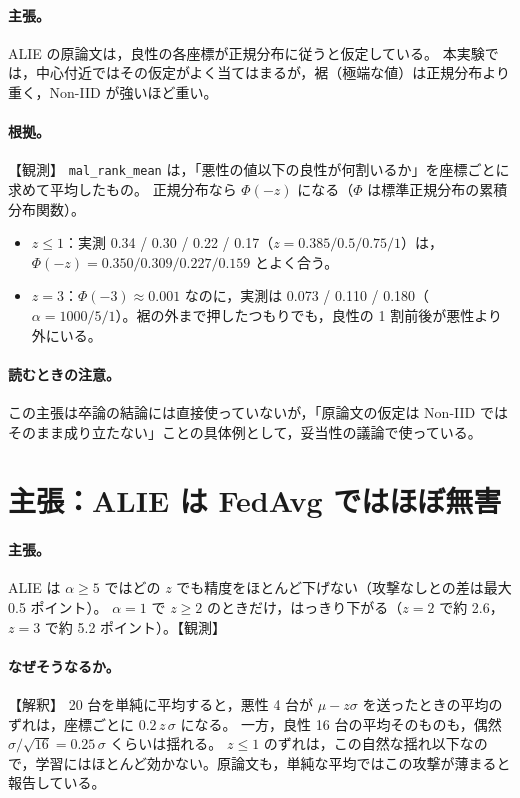 \documentclass[a4j, dvipdfmx]{jsarticle}  %
\begin{document}
\paragraph{主張。}
ALIE の原論文は，良性の各座標が正規分布に従うと仮定している。
本実験では，中心付近ではその仮定がよく当てはまるが，裾（極端な値）は正規分布より重く，Non-IID が強いほど重い。

\paragraph{根拠。}【観測】
\texttt{mal\_rank\_mean} は，「悪性の値以下の良性が何割いるか」を座標ごとに求めて平均したもの。
正規分布なら $\Phi(-z)$ になる（$\Phi$ は標準正規分布の累積分布関数）。
\begin{itemize}
  \item $z \le 1$：実測 0.34 / 0.30 / 0.22 / 0.17（$z = 0.385 / 0.5 / 0.75 / 1$）は，$\Phi(-z) = 0.350 / 0.309 / 0.227 / 0.159$ とよく合う。
  \item $z = 3$：$\Phi(-3) \approx 0.001$ なのに，実測は 0.073 / 0.110 / 0.180（$\alpha = 1000 / 5 / 1$）。裾の外まで押したつもりでも，良性の 1 割前後が悪性より外にいる。
\end{itemize}

\paragraph{読むときの注意。}
この主張は卒論の結論には直接使っていないが，「原論文の仮定は Non-IID ではそのまま成り立たない」ことの具体例として，妥当性の議論で使っている。

\section{主張：ALIE は FedAvg ではほぼ無害}
\label{sec:claim-harm}

\paragraph{主張。}
ALIE は $\alpha \ge 5$ ではどの $z$ でも精度をほとんど下げない（攻撃なしとの差は最大 0.5 ポイント）。
$\alpha = 1$ で $z \ge 2$ のときだけ，はっきり下がる（$z = 2$ で約 2.6，$z = 3$ で約 5.2 ポイント）。【観測】

\paragraph{なぜそうなるか。}【解釈】
20 台を単純に平均すると，悪性 4 台が $\mu - z\sigma$ を送ったときの平均のずれは，座標ごとに $0.2\,z\,\sigma$ になる。
一方，良性 16 台の平均そのものも，偶然 $\sigma / \sqrt{16} = 0.25\,\sigma$ くらいは揺れる。
$z \le 1$ のずれは，この自然な揺れ以下なので，学習にはほとんど効かない。原論文も，単純な平均ではこの攻撃が薄まると報告している。
\end{document}
